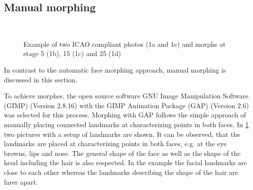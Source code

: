 \subsection{Manual morphing}
\label{manual_morph}
\begin{figure}[h]
	\centering
	\label{subfig:manualmorph01}\hspace{10pt}
	\label{subfig:manualmorph02}\\
	\caption{Example of two ICAO compliant photos (1a and 1e) and morphs at stage 5 (1b), 15 (1c) and 25 (1d)}
	\label{fig:manual_morph} 
\end{figure}
In contrast to the automatic face morphing approach, manual morphing is discussed in this section. 

To achieve morphes, the open source software GNU Image Manipulation Software (GIMP) (Version 2.8.16) with the GIMP Animation Package (GAP) (Version 2.6) was selected for this process. Morphing with GAP follows the simple approach of manually placing connected landmarks at characterizing points in both faces. In \ref{fig:manual_morph} two pictures with a setup of landmarks are shown. It can be observed, that the landmarks are placed at characterizing points in both faces, e.g. at the eye browns, lips and nose. The general shape of the face as well as the shape of the head including the hair is also respected. In the example the facial landmarks are close to each other whereas the landmarks describing the shape of the hair are farer apart. 

